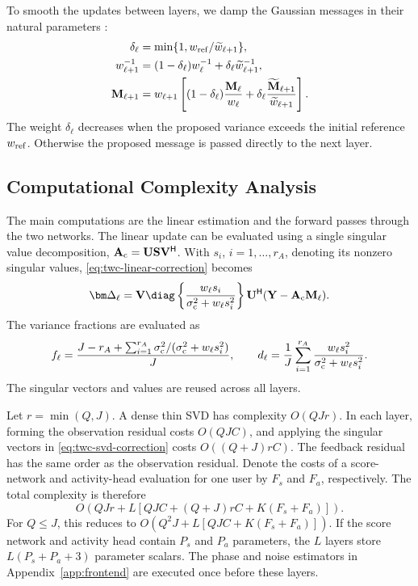 To smooth the updates between layers, we damp the Gaussian messages
in their natural parameters \cite[Sec.~5.2]{vehtari2020}:
\begin{align}
 \delta_\ell&=\min\{1,w_{\rm ref}/\widetilde w_{\ell+1}\},
 \label{eq:twc-damping-weight}\\
 w_{\ell+1}^{-1}&=(1-\delta_\ell)w_\ell^{-1}
                   +\delta_\ell\widetilde w_{\ell+1}^{-1},
 \label{eq:twc-damping-precision}\\
 \mathbf M_{\ell+1}&=w_{\ell+1}
 \left[(1-\delta_\ell)\frac{\mathbf M_\ell}{w_\ell}
       +\delta_\ell\frac{\widetilde{\mathbf M}_{\ell+1}}
                          {\widetilde w_{\ell+1}}\right].
 \label{eq:twc-damping-mean}
\end{align}
The weight $\delta_\ell$ decreases when the proposed variance exceeds
the initial reference $w_{\rm ref}$. Otherwise the proposed message is
passed directly to the next layer.

\subsection{Computational Complexity Analysis}

The main computations are the linear estimation and the forward
passes through the two networks. The linear update can be evaluated
using a single singular value decomposition,
$\mathbf A_{\rm c}=\mathbf U\mathbf S\mathbf V^{\mathsf H}$.
With $s_i$, $i=1,\ldots,r_A$, denoting its nonzero singular values,
\eqref{eq:twc-linear-correction} becomes
\begin{equation}
 \bm\Delta_\ell=\mathbf V
 \diag\left\{\frac{w_\ell s_i}{\sigma_{\rm c}^2+w_\ell s_i^2}\right\}
 \mathbf U^{\mathsf H}(\mathbf Y-\mathbf A_{\rm c}\mathbf M_\ell).
 \label{eq:twc-svd-correction}
\end{equation}
The variance fractions are evaluated as
\begin{equation}
 f_\ell=\frac{J-r_A+\sum_{i=1}^{r_A}
 \sigma_{\rm c}^2/(\sigma_{\rm c}^2+w_\ell s_i^2)}{J},\qquad
 d_\ell=\frac1J\sum_{i=1}^{r_A}
 \frac{w_\ell s_i^2}{\sigma_{\rm c}^2+w_\ell s_i^2}.
 \label{eq:twc-linear-fractions}
\end{equation}
The singular vectors and values are reused across all layers.

Let $r=\min(Q,J)$. A dense thin SVD has complexity $O(QJr)$.
In each layer, forming the observation residual costs $O(QJC)$,
and applying the singular vectors in \eqref{eq:twc-svd-correction}
costs $O((Q+J)rC)$. The feedback residual has the same order as the
observation residual. Denote the costs of a score-network and
activity-head evaluation for one user by $F_s$ and $F_a$,
respectively. The total complexity is therefore
\begin{equation}
 O\left(QJr+
 L\left[QJC+(Q+J)rC+K(F_s+F_a)\right]\right).
 \label{eq:twc-complexity}
\end{equation}
For $Q\leq J$, this reduces to
$O(Q^2J+L[QJC+K(F_s+F_a)])$.
If the score network and activity head contain $P_s$ and $P_a$
parameters, the $L$ layers store $L(P_s+P_a+3)$ parameter scalars.
The phase and noise estimators in Appendix~\ref{app:frontend}
are executed once before these layers.
